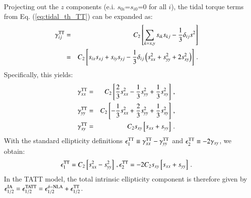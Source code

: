 Projecting out the $z$ components (e.i. $s_{0i}$=$s_{i0}$=0 for all $i$),  the tidal torque terms from Eq. (\ref{eq:tidal_th_TT}) can be expanded as:
 \begin{eqnarray}
\gamma^{\rm TT}_{ij}&=& C_2 \left[\sum_{k=x,y} s_{ik} s_{kj} -\frac{1}{3} \delta_{ij} s^2\right] \\
                                  &=&C_2 \left[ s_{ix}s_{xj}  + s_{iy}s_{yj}  -  \frac{1}{3} \delta_{ij} \left( s_{xx}^2 + s_{yy}^2 +2s_{xy}^2 \right)  \right] \, .
\end{eqnarray}
Specifically, this yields:
 \begin{eqnarray}
\gamma^{\rm TT}_{xx}&=& C_2 \left[\frac{2}{3}s_{xx}^2  -  \frac{1}{3}s_{yy}^2 + \frac{1}{3}s_{xy}^2 \right]\, ,  \nonumber \\
\gamma^{\rm TT}_{yy}&=& C_2 \left[-\frac{1}{3}s_{xx}^2  +  \frac{2}{3}s_{yy}^2 + \frac{1}{3}s_{xy}^2  \right]\, , \\
\gamma^{\rm TT}_{xy}&=& C_2 s_{xy}\left[s_{xx}+s_{yy}  \right]\, . \nonumber                                  
\end{eqnarray}
With the standard ellipticity definitions $\epsilon_1^{\rm TT}\equiv \gamma_{xx}^{\rm TT} - \gamma_{yy}^{\rm TT}$ and $\epsilon_2^{\rm TT}\equiv -2 \gamma_{xy}$, we obtain:
\begin{eqnarray}
\epsilon_1^{\rm TT} = C_2  \left[ s_{xx}^2 - s_{yy}^2\right] \, , \epsilon_2^{\rm TT} = -2 C_2 s_{xy}\left[s_{xx}+s_{yy}  \right]\, .
\end{eqnarray}
In the TATT model, the total intrinsic ellipticity component is therefore given by $\epsilon_{1/2}^{\rm IA} = \epsilon_{1/2}^{\rm TATT} = \epsilon_{1/2}^{\delta{\rm-NLA}} + \epsilon_{1/2}^{\rm TT}$.